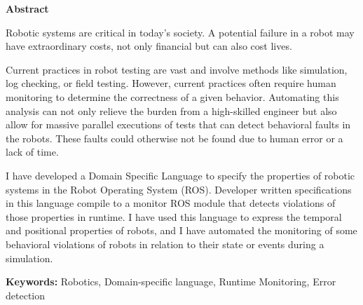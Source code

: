 \vspace*{2cm}
\begin{center}
\Large \bf Abstract
\end{center}
\vspace*{1cm} \setlength{\baselineskip}{0.6cm}

Robotic systems are critical in today's society. A potential failure in a robot may have extraordinary costs, not only financial but can also cost lives.

Current practices in robot testing are vast and involve methods like simulation, log checking, or field testing. However, current practices often require human monitoring to determine the correctness of a given behavior. Automating this analysis can not only relieve the burden from a high-skilled engineer but also allow for massive parallel executions of tests that can detect behavioral faults in the robots. These faults could otherwise not be found due to human error or a lack of time.
    
I have developed a Domain Specific Language to specify the properties of robotic systems in the Robot Operating System (ROS). Developer written specifications in this language compile to a monitor ROS module that detects violations of those properties in runtime. I have used this language to express the temporal and positional properties of robots, and I have automated the monitoring of some behavioral violations of robots in relation to their state or events during a simulation.


\vfill

\begin{flushleft}
\textbf{Keywords:}
Robotics, Domain-specific language, Runtime Monitoring, Error detection
\end{flushleft}
